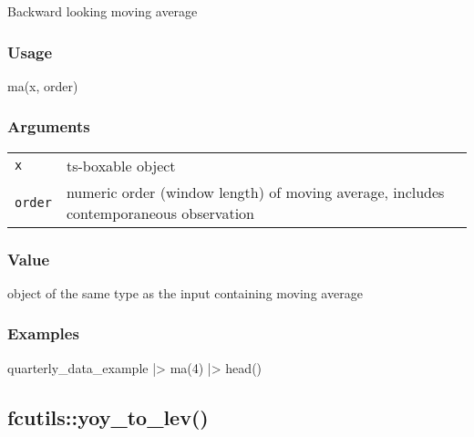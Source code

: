 \documentclass[
  letterpaper,
  DIV=11,
  numbers=noendperiod]{scrreport}
\newenvironment{Shaded}{\begin{snugshade}}{\end{snugshade}}
\newcommand{\DecValTok}[1]{\textcolor[rgb]{0.68,0.00,0.00}{#1}}
\newcommand{\FunctionTok}[1]{\textcolor[rgb]{0.28,0.35,0.67}{#1}}
\newcommand{\NormalTok}[1]{\textcolor[rgb]{0.00,0.23,0.31}{#1}}
\newcommand{\SpecialCharTok}[1]{\textcolor[rgb]{0.37,0.37,0.37}{#1}}
\begin{document}
Backward looking moving average

\subsubsection{Usage}\label{usage-37}

\begin{Shaded}
\begin{Highlighting}[]
\FunctionTok{ma}\NormalTok{(x, order)}
\end{Highlighting}
\end{Shaded}

\subsubsection{Arguments}\label{arguments-37}

\begin{longtable}[]{@{}ll@{}}
\toprule\noalign{}
\endhead
\bottomrule\noalign{}
\endlastfoot
\texttt{x} & ts-boxable object \\
\texttt{order} & numeric order (window length) of moving average,
includes contemporaneous observation \\
\end{longtable}

\subsubsection{Value}\label{value-37}

object of the same type as the input containing moving average

\subsubsection{Examples}\label{examples-37}

\begin{Shaded}
\begin{Highlighting}[]
\NormalTok{quarterly\_data\_example }\SpecialCharTok{|\textgreater{}}
  \FunctionTok{ma}\NormalTok{(}\DecValTok{4}\NormalTok{) }\SpecialCharTok{|\textgreater{}}
  \FunctionTok{head}\NormalTok{()}
\end{Highlighting}
\end{Shaded}

\subsection{fcutils::yoy\_to\_lev()}\label{fcutilsyoy_to_lev}
\end{document}
